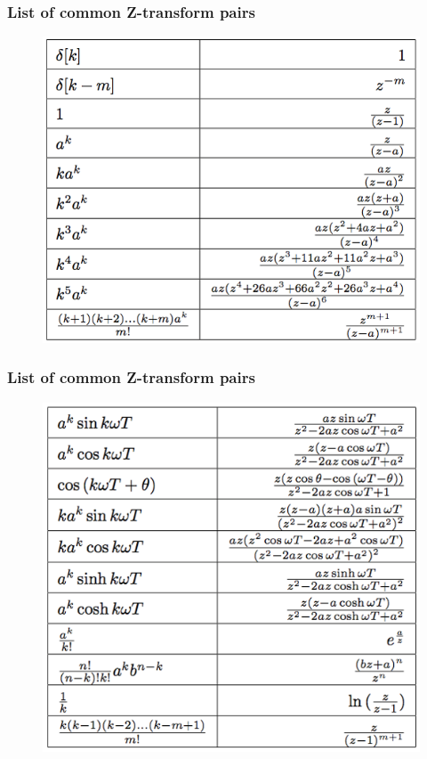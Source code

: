 \begin{frame}
	\frametitle{List of common Z-transform pairs}
	\begin{figure}
\centering
\includegraphics[height=0.8\textheight]{Images/discrete_time_systems_22}

\label{fig:discrete_time_systems_22}
\end{figure}

	
\end{frame}
\begin{frame}
	\frametitle{List of common Z-transform pairs}
	\begin{figure}
\centering
\includegraphics[height=0.8\textheight]{Images/discrete_time_systems_23}
\caption{}
\label{fig:discrete_time_systems_23}
\end{figure}

\end{frame}
